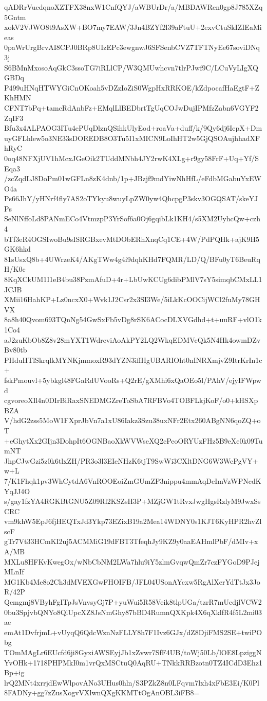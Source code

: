 qADRrVucdqnoXZTFX38nxW1CnfQYJ/aWBUrDr/a/MBDAWRen0gp8J785XZq5Gntm
xokV2VJWO8t9AsXW+BO7my7EAW/3Jn4BZYf2l39aFtuU+2exvCtuSkIZIEaMieas
0paWrUrgBrvAI8CPJ0BRp8UIzEPc3ewgnwJ6SFSenbCVZ7TFTNyEe67soviDNq3j
S6BMnMxosoAqGkC3ssoTG7iRLlCP/W3QMUwhcvn7tlrPJwf9C/LCuVyLIgXQGBDq
P499uHNqHTWYGiCnOKoah5vDZzIoZiS0WgpHxRRKOE/kZdpocafHaEgtF+ZKhHMN
CFNT7bPq+tamcRdAnbFz+EMqlLlBEDbrtTgUqCOJwDujIPMfzZabn6VGYF2ZqIF3
Bfu3x4ALPAOG3ITu4ePUqDlznQSihkUlyEod+roaVa+duff/k/9Qy6dj6IepX+Dm
uyGFLhlew5o3NE33sDOREDB8O3Tu5I1xMICN9LoIhHT2w5GjQSOAujhhadXFhRyC
0oq48NFXjUV1hMcxJGeOik2TUddMNbh4JY2rwK4XLg+r9gy58FrF+Uq+Yf/SEqa3
/zcZqdLJ8DoPm01wGFLn8zK4dnb/1p+JBzjf9mdYiwNhHfL/eFdbMGabuYxEWO4a
Ps66JhY/yHNrf4fly7AS2oTYkyu8wuyLpZW0yw4QhcpgP3skv3OGQSAT/skeYJPs
SeNlNffoLd8PANmECo4VtmzpP3YrSof6a0Oj6gqibLk1KH4/s5XM2UyhcQw+czh4
bTf3eR4OGSIwoBu9sISRGBxevMtDObERhXnqCq1CE+4W/PdPQHk+ajK9H5GK6hkd
81sUsxQ8b+4UWrzeK4/AKgTWw4g4i9dqhKHd7FQMR/LD/Q/BFu0yT6BeuRqH/K0c
8KqXCkUM1I1eB4bu38PzmAfuD+4r+LbUwKCUg6dibPMlV7sY5simqbCMxLL1JCJB
XMii16HahKP+Lz0ncxX0+Wvk1J2Csr2x3SI3We/5iLkKcOOCijWCl2fuMy78GHVX
8a8h40Qvom693TQnNg54GwSxFb5vDg8rSK6ACocDLXVGdhd+t+uuRF+vlO1k1Co4
aJ2zuKbOb8Z8v28mYXT1WdreviAoAkPY2LQ2WkqEDMVcQk5N4Hk4owmDZvBv80tb
PHduHTlSkrqlkMYNKjmmoxR93dYZN3iffHgUBARIOht0nINRXmjvZ9ItrKrIn1c+
fskPmouvl+5ybkgl48FGaRdUVooRs+Q2rE/gXMhi6xQaOEo5l/PAhV/ejyIFWpwd
cgvoreoXIl4n0DIrBiRaxSNEDMGZreToSbA7RFBVo4TOBFLkjKoF/o0+kHSXpBZA
V/hdG2zss5MoW1FXprJbVn7a1xU86Iakz3Szu38uxNFr2Etx260ABgNN6qoZQ+oT
+eGhytXx2GIjn3DohpIt6OGNBaoXkWVWseXQ2cPeoORYUzFHz5B9eXe0k09TumNT
JhpCJwGzi5z0k6tlxZH/PR3o3l3EIeNHzK6tjT9SwWi3CXltDNG6W3WcPgVY+w+L
7/K1Fhqk1pv3WhCytdA6VnROOEoiZmGUmZP3nippu4mmAqDeImVzWPNcdKYqJJ4O
s/gay1fzYA4RGKBtGNU5Z09Rl2KSZsH3P+MZjGW1tRvxJwgHgsRzlyM9JwxSsCRC
vm9khW5EpJ6fjHEQTxJd3Ykp73EZixB19a2Mea14WDNY0s1KJT6KyHPR2hvZlscF
gTr7Vt33HCmKI2uj5ACMMiG19dFBT3TfeqhJy9KZ9y0aaEAHmlPbF/dMIv+xA/MB
MXLu8HFKvKwegOx/wNbCbNM2LWa7hlu9iY5zlmGvqwQmZr7czFYGoD9PJejMLnIf
MG1Kb4Me8o2Ch3dMVEXGwFHOIFB/JFL04USonAYcxw5RgAlXerYdTtJx3JoR/42P
Qemgmj8VByhFgITpJsVnvsyGj7P+yuWui5R58Veik8tlpUGa/tzrR7mUcdjlVCW2
0bu3SpjvbQNYo8QlUpcXZ8JsNmGhy87bBD4RumnQXKpk4X6qXklfR4f5L2mi03ae
emAt1DvfrjmL+vUyqQ6QdcWznNzFLLY8h7F1Ivz6GJx/dZ8DjiFMS2SE+twiPObg
TOmMAgLr6EUcfd6ji8GyxiAWSEyjJb1xZvwr7SfF4UB/toWj50Lb/lOE8LpziggN
YvOHk+1718PHPMkI0m1vrQxMSCtuQ0AqRU+TNkkRRBzotn0TZ4ICdD3Ehz1Bp+ig
lrQ2MNt4xrrjdEwWlpovANo3UHus0hln/S3PZkZ8n0LFqvm7lxh4xFbE3Ei/K0Pl
8FADNy+gg7zZusXogvVXlwnQXgKKMTtOgAnOBL3iFB8=
